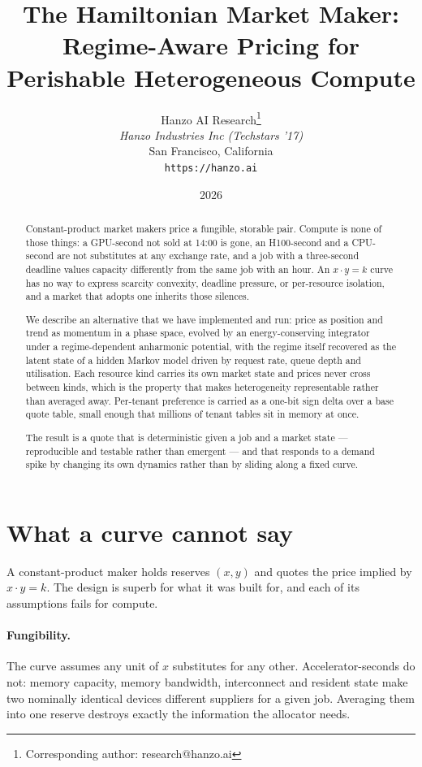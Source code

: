 \documentclass[11pt,a4paper]{article}
\title{The Hamiltonian Market Maker:\\Regime-Aware Pricing for Perishable Heterogeneous Compute}
\author{
Hanzo AI Research\thanks{Corresponding author: research@hanzo.ai} \\
\textit{Hanzo Industries Inc (Techstars '17)} \\
San Francisco, California \\
\texttt{https://hanzo.ai}
}
\date{2026}
\begin{document}
\hanzocoverpage

\begin{abstract}
Constant-product market makers price a fungible, storable pair. Compute is
none of those things: a GPU-second not sold at 14:00 is gone, an H100-second and
a CPU-second are not substitutes at any exchange rate, and a job with a
three-second deadline values capacity differently from the same job with an hour.
An $x \cdot y = k$ curve has no way to express scarcity convexity, deadline
pressure, or per-resource isolation, and a market that adopts one inherits those
silences.

We describe an alternative that we have implemented and run: price as position
and trend as momentum in a phase space, evolved by an energy-conserving
integrator under a regime-dependent anharmonic potential, with the regime itself
recovered as the latent state of a hidden Markov model driven by request rate,
queue depth and utilisation. Each resource kind carries its own market state and
prices never cross between kinds, which is the property that makes heterogeneity
representable rather than averaged away. Per-tenant preference is carried as a
one-bit sign delta over a base quote table, small enough that millions of tenant
tables sit in memory at once.

The result is a quote that is deterministic given a job and a market state ---
reproducible and testable rather than emergent --- and that responds to a demand
spike by changing its own dynamics rather than by sliding along a fixed curve.
\end{abstract}

\tableofcontents
\newpage

\section{What a curve cannot say}

A constant-product maker holds reserves $(x, y)$ and quotes the price implied by
$x \cdot y = k$. The design is superb for what it was built for, and each of its
assumptions fails for compute.

\paragraph{Fungibility.} The curve assumes any unit of $x$ substitutes for any
other. Accelerator-seconds do not: memory capacity, memory bandwidth, interconnect
and resident state make two nominally identical devices different suppliers for a
given job. Averaging them into one reserve destroys exactly the information the
allocator needs.
\end{document}
